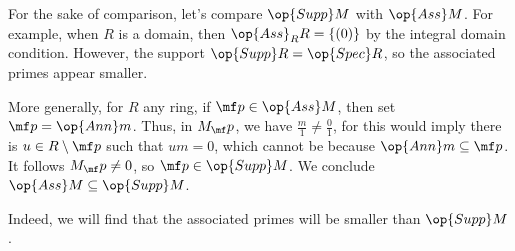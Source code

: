 \begin{remark}
	For the sake of comparison, let's compare $\op{Supp}M$ with $\op{Ass}M$. For example, when $R$ is a domain, then $\op{Ass}_RR=\{(0)\}$ by the integral domain condition. However, the support $\op{Supp}R=\op{Spec}R$, so the associated primes appear smaller.

	More generally, for $R$ any ring, if $\mf p\in\op{Ass}M$, then set $\mf p=\op{Ann}m$. Thus, in $M_\mf p$, we have $\frac m1\ne\frac01$, for this would imply there is $u\in R\setminus\mf p$ such that $um=0$, which cannot be because $\op{Ann}m\subseteq\mf p$. It follows $M_\mf p\ne0$, so $\mf p\in\op{Supp}M$. We conclude $\op{Ass}M\subseteq\op{Supp}M$.
\end{remark}
Indeed, we will find that the associated primes will be smaller than $\op{Supp}M$.

